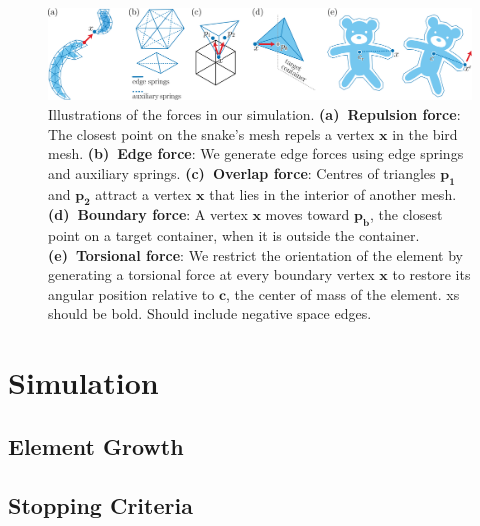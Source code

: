 \begin{figure}[t]
\centering
\includegraphics[width=1.0\textwidth]{figures/repulsionpak/all_forces.pdf}
\caption[Forces]{
\label{fig_forces}
Illustrations of the forces in our simulation.
\;\textbf{(a)~Repulsion force}:
The closest point on the snake's mesh
repels a vertex $\bm{x}$ in the bird mesh.
\textbf{(b)~Edge force}: 
We generate edge forces using
edge springs and auxiliary springs.
\textbf{(c)~Overlap force}: 
Centres of triangles $\bm{p_1}$ and $\bm{p_2}$ attract a vertex
$\bm{x}$ that lies in the interior of another mesh.
\;\textbf{(d)~Boundary force}: A vertex $\bm{x}$ moves toward $\bm{p_b}$,
the closest point on a target container, when it is outside the container.
\textbf{(e)~Torsional force}: We restrict the orientation of the element by generating 
a torsional force at every boundary vertex $\bm{x}$
to restore its angular position relative to $\bm{c}$, 
the center of mass of the element.
\mynote
{
xs should be bold.
Should include negative space edges.
}
}
\end{figure}



\section{Simulation}


\subsection{Element Growth}




\subsection{Stopping Criteria}



